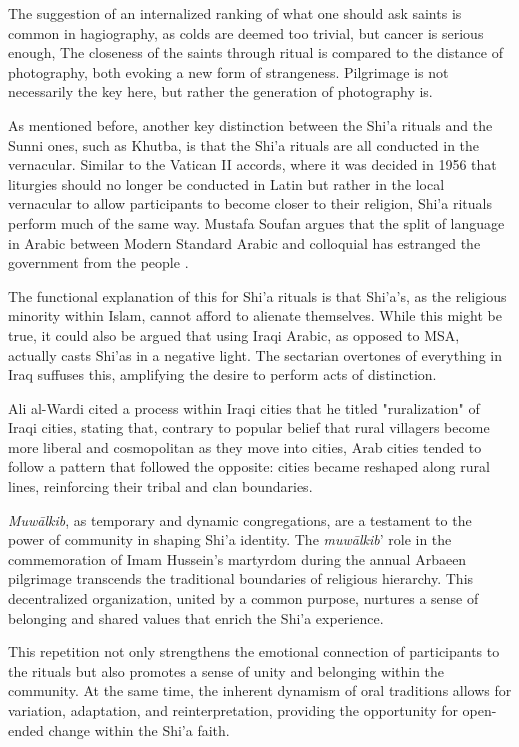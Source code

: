 The suggestion of an internalized ranking of what one should ask saints is common in hagiography, as colds are deemed too trivial, but cancer is serious enough, The closeness of the saints through ritual is compared to the distance of photography, both evoking a new form of strangeness. Pilgrimage is not necessarily the key here, but rather the generation of photography is. 

As mentioned before, another key distinction between the Shi'a rituals and the Sunni ones, such as Khutba, is that the Shi'a rituals are all conducted in the vernacular. Similar to the Vatican II accords, where it was decided in 1956 that liturgies should no longer be conducted in Latin but rather in the local vernacular to allow participants to become closer to their religion, Shi'a rituals perform much of the same way. Mustafa Soufan argues that the split of language in Arabic between Modern Standard Arabic and colloquial has estranged the government from the people \cite{safouan_why_2007}. 

The functional explanation of this for Shi'a rituals is that Shi'a’s, as the religious minority within Islam, cannot afford to alienate themselves. While this might be true, it could also be argued that using Iraqi Arabic, as opposed to MSA, actually casts Shi'as in a negative light. The sectarian overtones of everything in Iraq suffuses this, amplifying the desire to perform acts of distinction. 

Ali al-Wardi cited a process within Iraqi cities that he titled "ruralization" of Iraqi cities, stating that, contrary to popular belief that rural villagers become more liberal and cosmopolitan as they move into cities, Arab cities tended to follow a pattern that followed the opposite: cities became reshaped along rural lines, reinforcing their tribal and clan boundaries.

\emph{Muwālkib}, as temporary and dynamic congregations, are a testament to the power of community in shaping Shi'a identity. The \emph{muwālkib}' role in the commemoration of Imam Hussein's martyrdom during the annual Arbaeen pilgrimage transcends the traditional boundaries of religious hierarchy. This decentralized organization, united by a common purpose, nurtures a sense of belonging and shared values that enrich the Shi'a experience.

This repetition not only strengthens the emotional connection of participants to the rituals but also promotes a sense of unity and belonging within the community. At the same time, the inherent dynamism of oral traditions allows for variation, adaptation, and reinterpretation, providing the opportunity for open-ended change within the Shi'a faith.

